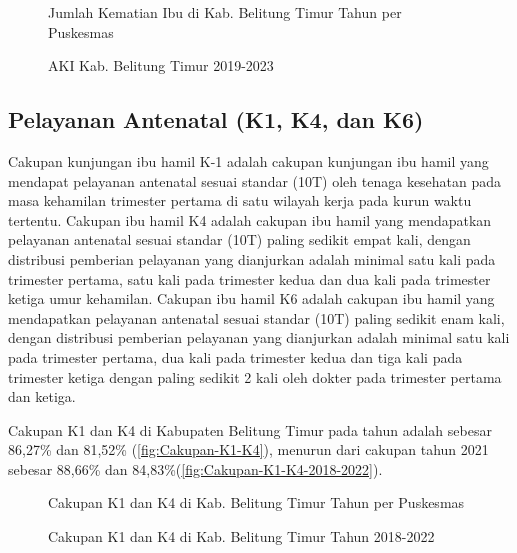 \begin{figure}[H]
    \centering{}
    \caption{Jumlah Kematian Ibu di Kab. Belitung Timur Tahun \tP per Puskesmas}
    \label{fig:Jumlah-Kematian-Ibu}
\end{figure}

\begin{figure}[H]
    \centering{}
    \caption{AKI Kab. Belitung Timur 2019-2023}
    \label{fig:AKI-2019-2023}
\end{figure}

\subsection{Pelayanan Antenatal (K1, K4, dan K6)}
Cakupan kunjungan ibu hamil K-1 adalah cakupan kunjungan ibu hamil yang mendapat pelayanan antenatal sesuai standar (10T) oleh tenaga kesehatan pada masa kehamilan trimester
pertama di satu wilayah kerja pada kurun waktu tertentu. Cakupan ibu hamil K4 adalah cakupan ibu hamil yang mendapatkan pelayanan antenatal sesuai standar (10T) paling sedikit empat kali, dengan distribusi pemberian pelayanan yang dianjurkan adalah minimal satu kali pada trimester pertama, satu kali pada trimester kedua dan dua kali pada trimester ketiga umur kehamilan. Cakupan ibu hamil K6 adalah cakupan ibu hamil yang mendapatkan pelayanan antenatal sesuai standar (10T) paling sedikit enam kali, dengan distribusi pemberian pelayanan yang dianjurkan adalah minimal satu kali pada trimester pertama, dua kali pada trimester kedua dan tiga kali pada trimester ketiga dengan paling sedikit 2 kali oleh dokter pada trimester pertama dan ketiga.

Cakupan K1 dan K4 di Kabupaten Belitung Timur pada tahun \tP adalah sebesar 86,27\% dan 81,52\% (\autoref{fig:Cakupan-K1-K4}), menurun dari cakupan tahun 2021 sebesar 88,66\% dan 84,83\%(\autoref{fig:Cakupan-K1-K4-2018-2022}).

\begin{figure}[H]
    \centering{}
    \caption{Cakupan K1 dan K4 di Kab. Belitung Timur Tahun \tP per Puskesmas}
    \label{fig:Cakupan-K1-K4}
\end{figure}

\begin{figure}[H]
    \centering{}
    \caption{Cakupan K1 dan K4 di Kab. Belitung Timur Tahun 2018-2022}
    \label{fig:Cakupan-K1-K4-2018-2022}
\end{figure}

